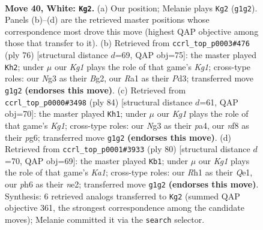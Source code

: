 \documentclass[11pt]{article}
\begin{document}
\clearpage

\begin{figure}[p]\centering
\begin{subfigure}{0.46\textwidth}\centering
\resizebox{\linewidth}{!}{%
\newchessgame
\chessboard[
  setfen={5n1k/ppQ4p/7p/1r6/3P4/4q1N1/8/R5KR w - - 4 40},
  showmover=false,
  pgfstyle=straightmove, color=movearrow, markmove={g1-g2}
]}
\caption{}
\end{subfigure}\hfill
\begin{subfigure}{0.46\textwidth}\centering
\resizebox{\linewidth}{!}{%
\newchessgame
\chessboard[
  setfen={6k1/3b1pp1/7p/2rp4/3N3P/3Pq3/6B1/Q4RK1 w - - 2 39},
  showmover=false,
  pgfstyle=straightmove, color=movearrow, markmove={g1-h2}
]}
\caption{}
\end{subfigure}
\\[4pt]
\begin{subfigure}{0.46\textwidth}\centering
\resizebox{\linewidth}{!}{%
\newchessgame
\chessboard[
  setfen={2Q5/1p5n/2pp2pk/8/p1P5/6q1/8/3RR1K1 w - - 1 43},
  showmover=false,
  pgfstyle=straightmove, color=movearrow, markmove={g1-h1}
]}
\caption{}
\end{subfigure}\hfill
\begin{subfigure}{0.46\textwidth}\centering
\resizebox{\linewidth}{!}{%
\newchessgame
\chessboard[
  setfen={1k1N4/1p6/p5RP/5p2/4p3/q4N2/2P1n3/K3Q3 w - - 0 41},
  showmover=false,
  pgfstyle=straightmove, color=movearrow, markmove={a1-b1}
]}
\caption{}
\end{subfigure}
\caption{\textbf{Move 40, White: \texttt{Kg2}.} (a) Our position; Melanie plays \texttt{Kg2} (\texttt{g1g2}). Panels (b)--(d) are the retrieved master positions whose correspondence most drove this move (highest QAP objective among those that transfer to it). (b) Retrieved from \texttt{ccrl\_top\_p0003\#476} (ply 76) [structural distance $d$=69, QAP obj=75]: the master played \texttt{Kh2}; under $\mu$ our \emph{Kg1} plays the role of that game's \emph{Kg1}; cross-type roles: our \emph{N}g3 as their \emph{B}g2, our \emph{R}a1 as their \emph{P}d3; transferred move \texttt{g1g2} \textbf{(endorses this move)}. (c) Retrieved from \texttt{ccrl\_top\_p0000\#3498} (ply 84) [structural distance $d$=61, QAP obj=70]: the master played \texttt{Kh1}; under $\mu$ our \emph{Kg1} plays the role of that game's \emph{Kg1}; cross-type roles: our \emph{N}g3 as their \emph{p}a4, our \emph{n}f8 as their \emph{p}g6; transferred move \texttt{g1g2} \textbf{(endorses this move)}. (d) Retrieved from \texttt{ccrl\_top\_p0001\#3933} (ply 80) [structural distance $d$=70, QAP obj=69]: the master played \texttt{Kb1}; under $\mu$ our \emph{Kg1} plays the role of that game's \emph{Ka1}; cross-type roles: our \emph{R}h1 as their \emph{Q}e1, our \emph{p}h6 as their \emph{n}e2; transferred move \texttt{g1g2} \textbf{(endorses this move)}. Synthesis: 6 retrieved analogs transferred to \texttt{Kg2} (summed QAP objective 361, the strongest correspondence among the candidate moves); Melanie committed it via the \texttt{search} selector.}
\label{fig:thought-m78}
\end{figure}
\end{document}

